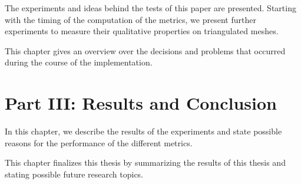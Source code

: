   \vspace{1mm}

\noindent  The experiments and ideas behind the tests of this paper are presented.
Starting with the timing of the computation of the metrics, we present further experiments to measure their qualitative properties on triangulated meshes.\\

  \vspace{1mm}

\noindent  This chapter gives an overview over the decisions and problems that occurred during the course of the implementation. \\

\section*{Part III: Results and Conclusion}

  \vspace{1mm}

\noindent  In this chapter, we describe the results of the experiments and state possible reasons for the performance of the different metrics. \\

  \vspace{1mm}

\noindent This chapter finalizes this thesis by summarizing the results of this thesis and stating possible future research topics.
